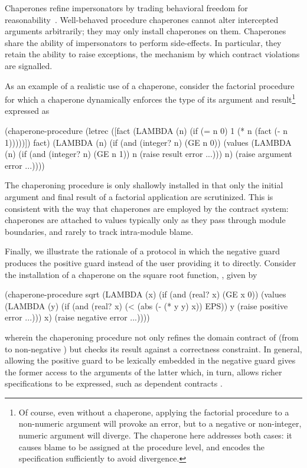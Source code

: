 \documentclass{sigplanconf}
\begin{document}
Chaperones refine impersonators by trading behavioral freedom for reasonability~\cite{strickland2012chaperones}.
Well-behaved procedure chaperones cannot alter intercepted arguments arbitrarily; they may only install chaperones on them.
Chaperones share the ability of impersonators to perform side-effects.
In particular, they retain the ability to raise exceptions, the mechanism by which contract violations are signalled.

As an example of a realistic use of a chaperone, consider the factorial procedure for which a chaperone dynamically enforces the type of its argument and result\footnote{Of course, even without a chaperone, applying the factorial procedure to a non-numeric argument will provoke an error, but to a negative or non-integer, numeric argument will diverge. The chaperone here addresses both cases: it causes blame to be assigned at the procedure level, and encodes the specification sufficiently to avoid divergence.} expressed as
\begin{schemedisplay}
(chaperone-procedure
 (letrec ([fact (LAMBDA (n)
                  (if (= n 0)
                      1
                      (* n (fact (- n 1)))))])
   fact)
 (LAMBDA (n)
   (if (and (integer? n) (GE n 0))
       (values (LAMBDA (n)
                 (if (and (integer? n) (GE n 1))
                     n
                     (raise result error ...)))
               n)
       (raise argument error ...))))
\end{schemedisplay}
The chaperoning procedure is only shallowly installed in that only the initial argument and final result of a factorial application are scrutinized.
This is consistent with the way that chaperones are employed by the contract system: chaperones are attached to values typically only as they pass through module boundaries, and rarely to track intra-module blame.

Finally, we illustrate the rationale of a protocol in which the negative guard produces the positive guard instead of the user providing it to  directly.
Consider the installation of a chaperone on the square root function, , given by
\begin{schemedisplay}
(chaperone-procedure
 sqrt
 (LAMBDA (x)
   (if (and (real? x) (GE x 0))
       (values (LAMBDA (y)
                 (if (and (real? x) (< (abs (- (* y y) x)) EPS))
                     y
                     (raise positive error ...)))
               x)
       (raise negative error ...))))
\end{schemedisplay}
wherein the chaperoning procedure not only refines the domain contract of  (from  to non-negative ) but checks its result against a correctness constraint.
In general, allowing the positive guard to be lexically embedded in the negative guard gives the former access to the arguments of the latter which, in turn, allows richer specifications to be expressed, such as dependent contracts \cite{findler2002contracts}.
\end{document}

